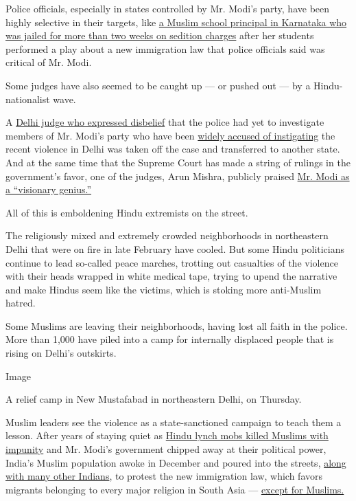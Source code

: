 Police officials, especially in states controlled by Mr. Modi's party,
have been highly selective in their targets, like
\href{https://scroll.in/article/951915/karnatakas-sedition-case-against-parent-and-teacher-for-a-school-play-is-absurd-and-illegal}{a
Muslim school principal in Karnataka who was jailed for more than two
weeks on sedition charges} after her students performed a play about a
new immigration law that police officials said was critical of Mr. Modi.

Some judges have also seemed to be caught up --- or pushed out --- by a
Hindu-nationalist wave.

A
\href{https://www.nytimes.com/2020/02/26/world/asia/india-hindu-muslim-violence-modi.html}{Delhi
judge who expressed disbelief} that the police had yet to investigate
members of Mr. Modi's party who have been
\href{https://www.nytimes.com/2020/02/26/world/asia/delhi-riots-kapil-mishra.html}{widely
accused of instigating} the recent violence in Delhi was taken off the
case and transferred to another state. And at the same time that the
Supreme Court has made a string of rulings in the government's favor,
one of the judges, Arun Mishra, publicly praised
\href{https://in.video.search.yahoo.com/yhs/search?fr=yhs-trp-001\&hsimp=yhs-001\&hspart=trp\&p=video+of+justice+arun+mishra+parising+narendra+modi\#id=51\&vid=86959a2615bb2d949c65c611e8811221\&action=click}{Mr.
Modi as a ``visionary genius.''}

All of this is emboldening Hindu extremists on the street.

The religiously mixed and extremely crowded neighborhoods in
northeastern Delhi that were on fire in late February have cooled. But
some Hindu politicians continue to lead so-called peace marches,
trotting out casualties of the violence with their heads wrapped in
white medical tape, trying to upend the narrative and make Hindus seem
like the victims, which is stoking more anti-Muslim hatred.

Some Muslims are leaving their neighborhoods, having lost all faith in
the police. More than 1,000 have piled into a camp for internally
displaced people that is rising on Delhi's outskirts.

Image

A relief camp in New Mustafabad in northeastern Delhi, on Thursday.

Muslim leaders see the violence as a state-sanctioned campaign to teach
them a lesson. After years of staying quiet as
\href{https://www.hrw.org/report/2019/02/18/violent-cow-protection-india/vigilante-groups-attack-minorities}{Hindu
lynch mobs killed Muslims with impunity} and Mr. Modi's government
chipped away at their political power, India's Muslim population awoke
in December and poured into the streets,
\href{https://www.nytimes.com/2020/01/17/world/asia/india-protests-aishe-ghosh.html}{along
with many other Indians}, to protest the new immigration law, which
favors migrants belonging to every major religion in South Asia ---
\href{https://www.nytimes.com/2019/12/09/world/asia/india-muslims-citizenship-narendra-modi.html}{except
for Muslims.}

